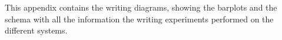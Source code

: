 This appendix contains the writing diagrams, showing the barplots and the schema with all the information the writing experiments performed on the different systems.